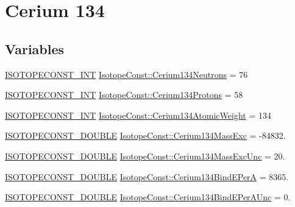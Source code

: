 \hypertarget{group___isotope_const-_cerium-_ce134}{}\section{Cerium 134}
\label{group___isotope_const-_cerium-_ce134}
\subsection*{Variables}
\begin{DoxyCompactItemize}
\item 
\mbox{\hyperlink{group___isotope_const-_macros_ga5f18360b3e99483a35c32d789e62621c}{I\+S\+O\+T\+O\+P\+E\+C\+O\+N\+S\+T\+\_\+\+I\+NT}} \mbox{\hyperlink{group___isotope_const-_cerium-_ce134_ga46bb65f72d7e49680418193d516f55af}{Isotope\+Const\+::\+Cerium134\+Neutrons}} = 76
\item 
\mbox{\hyperlink{group___isotope_const-_macros_ga5f18360b3e99483a35c32d789e62621c}{I\+S\+O\+T\+O\+P\+E\+C\+O\+N\+S\+T\+\_\+\+I\+NT}} \mbox{\hyperlink{group___isotope_const-_cerium-_ce134_ga093f95422ee405de7e2da9451766e328}{Isotope\+Const\+::\+Cerium134\+Protons}} = 58
\item 
\mbox{\hyperlink{group___isotope_const-_macros_ga5f18360b3e99483a35c32d789e62621c}{I\+S\+O\+T\+O\+P\+E\+C\+O\+N\+S\+T\+\_\+\+I\+NT}} \mbox{\hyperlink{group___isotope_const-_cerium-_ce134_ga35126b32b7653acd8e84456aa1600b23}{Isotope\+Const\+::\+Cerium134\+Atomic\+Weight}} = 134
\item 
\mbox{\hyperlink{group___isotope_const-_macros_ga8f45a7272ce02c0b4c65c44636ed719a}{I\+S\+O\+T\+O\+P\+E\+C\+O\+N\+S\+T\+\_\+\+D\+O\+U\+B\+LE}} \mbox{\hyperlink{group___isotope_const-_cerium-_ce134_ga399ff446585966dfe7ba92bfb6e99551}{Isotope\+Const\+::\+Cerium134\+Mass\+Exc}} = -\/84832.
\item 
\mbox{\hyperlink{group___isotope_const-_macros_ga8f45a7272ce02c0b4c65c44636ed719a}{I\+S\+O\+T\+O\+P\+E\+C\+O\+N\+S\+T\+\_\+\+D\+O\+U\+B\+LE}} \mbox{\hyperlink{group___isotope_const-_cerium-_ce134_ga1b5f5001927c6ce42590fe1c17743ef7}{Isotope\+Const\+::\+Cerium134\+Mass\+Exc\+Unc}} = 20.
\item 
\mbox{\hyperlink{group___isotope_const-_macros_ga8f45a7272ce02c0b4c65c44636ed719a}{I\+S\+O\+T\+O\+P\+E\+C\+O\+N\+S\+T\+\_\+\+D\+O\+U\+B\+LE}} \mbox{\hyperlink{group___isotope_const-_cerium-_ce134_gaf0db031636700068ac6e7c58869923c1}{Isotope\+Const\+::\+Cerium134\+Bind\+E\+PerA}} = 8365.
\item 
\mbox{\hyperlink{group___isotope_const-_macros_ga8f45a7272ce02c0b4c65c44636ed719a}{I\+S\+O\+T\+O\+P\+E\+C\+O\+N\+S\+T\+\_\+\+D\+O\+U\+B\+LE}} \mbox{\hyperlink{group___isotope_const-_cerium-_ce134_ga1cb01df930cfeb3cc6877a66835d50b3}{Isotope\+Const\+::\+Cerium134\+Bind\+E\+Per\+A\+Unc}} = 0.

\end{DoxyCompactItemize}
